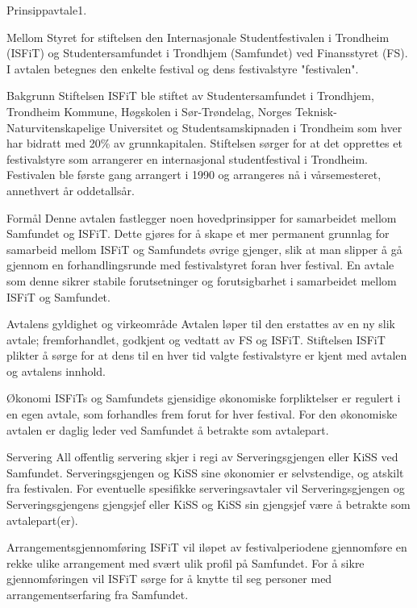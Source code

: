 
\begin{instruks}{Prinsippavtale}{1. }{ }

    \begin{instruksledd}{Mellom Styret for stiftelsen den Internasjonale Studentfestivalen i
Trondheim (ISFiT) og Studentersamfundet i Trondhjem (Samfundet) ved Finansstyret (FS).}
 I avtalen betegnes den enkelte festival og dens festivalstyre "festivalen".
    \end{instruksledd}

    \begin{instruksledd}{Bakgrunn}
       Stiftelsen ISFiT ble stiftet av Studentersamfundet i Trondhjem, Trondheim Kommune, Høgskolen
i Sør-Trøndelag, Norges Teknisk-Naturvitenskapelige Universitet og Studentsamskipnaden i Trondheim
som hver har bidratt med 20\% av grunnkapitalen. Stiftelsen sørger for at det opprettes et
festivalstyre som arrangerer en internasjonal studentfestival i Trondheim. Festivalen ble første
gang arrangert i 1990 og arrangeres nå i vårsemesteret, annethvert år oddetallsår.
     \end{instruksledd}
	\begin{instruksledd}{Formål}
        Denne avtalen fastlegger noen hovedprinsipper for samarbeidet mellom Samfundet og ISFiT.
Dette gjøres for å skape et mer permanent grunnlag for samarbeid mellom ISFiT og Samfundets øvrige
gjenger, slik at man slipper å gå gjennom en forhandlingsrunde med festivalstyret foran hver
festival. En avtale som denne sikrer stabile forutsetninger og forutsigbarhet i samarbeidet mellom
ISFiT og Samfundet.
	\end{instruksledd}        
\begin{instruksledd}{Avtalens gyldighet og virkeområde}
            Avtalen løper til den erstattes av en ny slik avtale; fremforhandlet, godkjent og
vedtatt av FS og ISFiT. Stiftelsen ISFiT plikter å sørge for at dens til en hver tid valgte
festivalstyre er kjent med avtalen og avtalens innhold.
        \end{instruksledd}
        \begin{instruksledd}{Økonomi}
ISFiTs og Samfundets gjensidige økonomiske forpliktelser er regulert i en egen avtale, som
forhandles frem forut for hver festival. For den økonomiske avtalen er daglig leder ved Samfundet å
betrakte som avtalepart.
        \end{instruksledd}
        \begin{instruksledd}{Servering}
            All offentlig servering skjer i regi av Serveringsgjengen eller KiSS ved Samfundet.
Serveringsgjengen og KiSS sine økonomier er selvstendige, og atskilt fra festivalen. For eventuelle
spesifikke serveringsavtaler vil Serveringsgjengen og Serveringsgjengens gjengsjef eller KiSS og
KiSS sin gjengsjef være å betrakte som avtalepart(er).
        \end{instruksledd}
	  \begin {instruksledd}{Arrangementsgjennomføring}
		ISFiT vil iløpet av festivalperiodene gjennomføre en rekke ulike arrangement med
svært ulik profil på Samfundet. For å sikre gjennomføringen vil ISFiT sørge for å knytte til seg
personer med arrangementserfaring fra Samfundet. 


\end{instruksledd}
\end{instruks}
